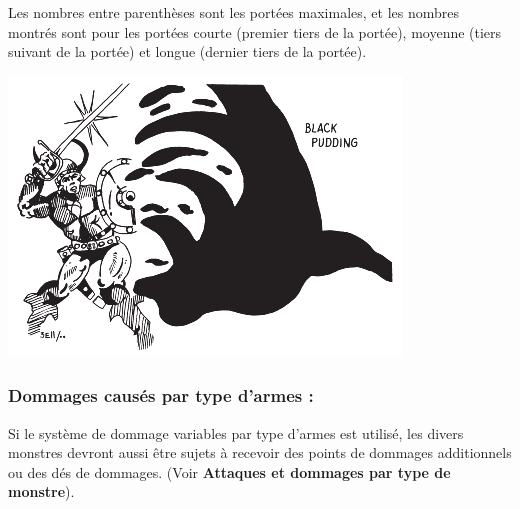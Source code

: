 {\parindent2cm \parbox{14.5cm}{Les nombres entre parenthèses sont les portées maximales, et les nombres montrés sont pour les portées courte (premier tiers de la portée), moyenne (tiers suivant de la portée) et longue (dernier tiers de la portée).}}

\begin{center}
\includegraphics[width=0.8\linewidth]{./images/black-pudding.png}
\end{center}

\subsubsection*{Dommages causés par type d'armes :}

Si le système de dommage variables par type d'armes est utilisé, les divers monstres devront aussi être sujets à recevoir des points de dommages additionnels ou des dés de dommages. (Voir \textbf{Attaques et dommages par type de monstre}).

\bigskip

